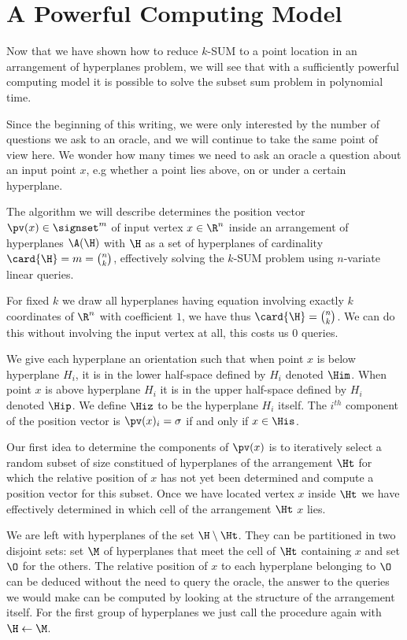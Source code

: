 \section{A Powerful Computing Model}

Now that we have shown how to reduce $k$-SUM to a point location in an
arrangement of hyperplanes problem, we will see that with a sufficiently
powerful computing model it is possible to solve the subset sum problem in
polynomial time.

Since the beginning of this writing, we were only interested by the number of
questions we ask to an oracle, and we will continue to take the same point of
view here. We wonder how many times we need to ask an oracle a question about
an input point $x$, e.g whether a point lies above, on or under a certain
hyperplane.

The algorithm we will describe determines the position vector $\pv(x) \in
\signset^{m}$ of input vertex $x \in \R^n$ inside an
arrangement of hyperplanes $\A(\H)$ with $\H$ as a set of hyperplanes
of cardinality $\card{\H} = m = \binom{n}{k}$,
effectively solving the $k$-SUM problem using  $n$-variate
linear queries.

For fixed $k$ we draw all hyperplanes having equation involving exactly $k$
coordinates of $\R^n$ with coefficient $1$, we have thus $\card{\H} =
\binom{n}{k}$. We can do this without involving the input vertex at all, this
costs us $0$ queries.

We give each hyperplane an orientation such that when point $x$ is below
hyperplane $H_i$, it is in the lower half-space defined by $H_i$ denoted
$\Him$. When point $x$ is above hyperplane $H_i$ it is in the upper
half-space defined by $H_i$ denoted $\Hip$. We define $\Hiz$ to be the
hyperplane $H_i$ itself. The $i^{th}$ component of the position vector is
$\pv(x)_i = \sigma$ if and only if $x \in \His$.

Our first idea to determine the components of $\pv(x)$ is to iteratively
select a random subset of size  constitued of hyperplanes of the
arrangement $\Ht$ for which the relative position of $x$ has not yet been
determined and compute a position vector for this subset. Once we have located
vertex $x$ inside $\Ht$ we have effectively determined in
which cell of the arrangement $\Ht$ $x$ lies.

We are left with hyperplanes of the set $\H \setminus \Ht$. They can be
partitioned in two disjoint sets: set $\M$ of hyperplanes that meet the cell of
$\Ht$ containing $x$ and set $\O$ for the others. The relative position of $x$
to each hyperplane belonging to $\O$ can be deduced without the need to query
the oracle, the answer to the queries we would make can be computed by looking
at the structure of the arrangement itself. For the first group of hyperplanes
we just call the procedure again with $\H \gets \M$.

